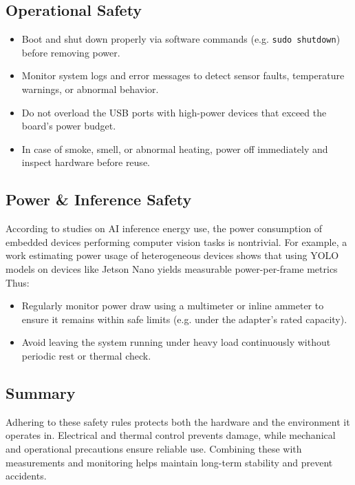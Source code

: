 \subsection{Operational Safety}

\begin{itemize}
	\item Boot and shut down properly via software commands (e.g. \texttt{sudo shutdown}) before removing power.  
	\item Monitor system logs and error messages to detect sensor faults, temperature warnings, or abnormal behavior.  
	\item Do not overload the USB ports with high-power devices that exceed the board’s power budget.  
	\item In case of smoke, smell, or abnormal heating, power off immediately and inspect hardware before reuse.
\end{itemize}

\subsection{Power \& Inference Safety}

According to studies on AI inference energy use, the power consumption of embedded devices performing computer vision tasks is nontrivial. For example, a work estimating power usage of heterogeneous devices shows that using YOLO models on devices like Jetson Nano yields measurable power-per-frame metrics 
Thus:

\begin{itemize}
	\item Regularly monitor power draw using a multimeter or inline ammeter to ensure it remains within safe limits (e.g. under the adapter’s rated capacity).  
	\item Avoid leaving the system running under heavy load continuously without periodic rest or thermal check.  
\end{itemize}

\subsection*{Summary}

Adhering to these safety rules protects both the hardware and the environment it operates in.  
Electrical and thermal control prevents damage, while mechanical and operational precautions ensure reliable use.  
Combining these with measurements and monitoring helps maintain long-term stability and prevent accidents.





